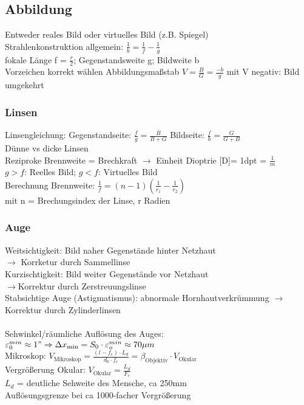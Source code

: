 \documentclass[fs, footer]{latex4ei}
\begin{document}
\begin{multicols*}{4}
\subsection{Abbildung}
Entweder reales Bild oder virtuelles Bild (z.B. Spiegel)\\
Strahlenkonstruktion allgemein: $\frac{1}{b}= \frac{1}{f} - \frac{1}{g}$\\
fokale Länge f = $\frac{r}{2}$; Gegenstandsweite g; Bildweite b\\
Vorzeichen korrekt wählen %
Abbildungsmaßstab $V = \frac{B}{G}=\frac{-b}{g}$ mit V negativ: Bild umgekehrt\\
\subsubsection{Linsen}
Linsengleichung:
Gegenstandseite: $\frac{f}{g} = \frac{B}{B+G}$
Bildseite: $\frac{f}{b}= \frac{G}{G+B}$\\
Dünne vs dicke Linsen\\ %
Reziproke Brennweite = Brechkraft $\rightarrow$ Einheit Dioptrie [D]= 1dpt = $\frac{1}{m}$\\
$g>f$: Reelles Bild;
$g<f$: Virtuelles Bild\\
Berechnung Brennweite: $\frac{1}{f}=(n-1)(\frac{1}{r_1}-\frac{1}{r_2})$\\
mit n = Brechungsindex der Linse, r Radien
\subsubsection{Auge}
Weitsichtigkeit: Bild naher Gegenstände hinter Netzhaut\\
$\rightarrow$ Korrketur durch Sammellinse\\
Kurzischtigkeit: Bild weiter Gegenstände vor Netzhaut\\
$\rightarrow$Korrektur durch Zerstreuungslinse\\
Stabsichtige Auge (Astigmatismus): abnormale Hornhautverkrümmung $\rightarrow$Korrektur durch Zylinderlinsen\\
\\Sehwinkel/räumliche Auflösung des Auges: $\varepsilon_0^{min} \approx 1" \Rightarrow \Delta x_{\text{min}} = S_0\cdot\varepsilon_o^{min} \approx 70 \mu m$\\
Mikroskop: $V_{\text{Mikroskop}} = \frac{(l-f_e)\cdot L_d}{d_0\cdot f_e} = \beta_{\text{Objektiv}}\cdot V_{\text{Okular}}$\\
Vergrößerung Okular: $V_{\text{Okular}} = \frac{L_d}{F_e}$\\
$L_d$ = deutliche Sehweite des Mensche, ca 250mm\\
Auflösungsgrenze bei ca 1000-facher Vergrößerung\\


\end{multicols*}
\end{document}
